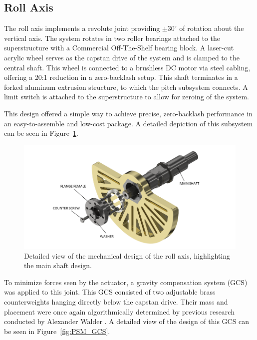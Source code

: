 \subsection{Roll Axis}
The roll axis implements a revolute joint providing $\pm 30^\circ$ of rotation about the vertical axis. The system rotates in two roller bearings attached to the superstructure with a Commercial Off-The-Shelf bearing block. A laser-cut acrylic wheel serves as the capstan drive of the system and is clamped to the central shaft. This wheel is connected to a brushless DC motor via steel cabling, offering a 20:1 reduction in a zero-backlash setup. This shaft terminates in a forked aluminum extrusion structure, to which the pitch subsystem connects. A limit switch is attached to the superstructure to allow for zeroing of the system.

This design offered a simple way to achieve precise, zero-backlash performance in an easy-to-assemble and low-cost package. A detailed depiction of this subsystem can be seen in Figure~\ref{fig:roll_detailed}.

\begin{figure}[htb!] %
    \centering
    \includegraphics[width=1.0\linewidth]{figures/roll_detailed.png}
    \caption{Detailed view of the mechanical design of the roll axis, highlighting the main shaft design. \cite{walder2022design}}
    \label{fig:roll_detailed}
\end{figure}

To minimize forces seen by the actuator, a gravity compensation system (GCS) was applied to this joint. This GCS consisted of two adjustable brass counterweights hanging directly below the capstan drive. Their mass and placement were once again algorithmically determined by previous research conducted by Alexander Walder \cite{walder2022design}. A detailed view of the design of this GCS can be seen in Figure~\ref{fig:PSM_GCS}.

